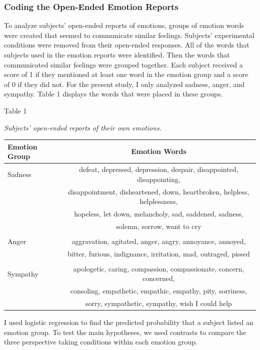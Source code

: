 \documentclass[man,a4paper,noextraspace,apacite]{apa6}\usepackage[]{graphicx}\usepackage[]{color}
\begin{document}
\subsubsection{Coding the Open-Ended Emotion Reports} To analyze subjects' open-ended reports of emotions, groups of emotion words were created that seemed to communicate similar feelings. Subjects' experimental conditions were removed from their open-ended responses. All of the words that subjects used in the emotion reports were identified. Then the words that communicated similar feelings were grouped together. Each subject received a score of 1 if they mentioned at least one word in the emotion group and a score of 0 if they did not. For the present study, I only analyzed sadness, anger, and sympathy. Table 1 displays the words that were placed in these groups. 

\begin{table}
Table 1

\textit{Subjects' open-ended reports of their own emotions.}

\begin{tabular}{l c}
    \hline
    Emotion Group & Emotion Words \\
    \hline
    Sadness & defeat, depressed, depression, despair, disappointed, disappointing, \\
    & disappointment, disheartened, down, heartbroken, helpless, helplessness, \\
    & hopeless, let down, melancholy, sad, saddened, sadness, \\
    & solemn, sorrow, want to cry \\
    & \\
    Anger & aggravation, agitated, anger, angry, annoyance, annoyed, \\ 
    & bitter, furious, indignance, irritation, mad, outraged, pissed \\
    & \\
    Sympathy & apologetic, caring, compassion, compassionate, concern, concerned, \\
    & consoling, empathetic, empathic, empathy, pity, sorriness, \\ 
    & sorry, sympathetic, sympathy, wish I could help \\
    \hline
\end{tabular}
\end{table}

I used logistic regression to find the predicted probability that a subject listed an emotion group. To test the main hypotheses, we used contrasts to compare the three perspective taking conditions within each emotion group. 
\end{document}
